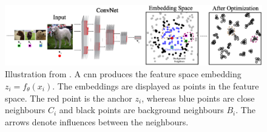 \begin{figure}[h] %
    \centering
    \includegraphics[width=360pt]{images/la_neighbourhoods.png}
    \caption{Illustration from \citet{local_aggr_2019}.
    A \ac{cnn} produces the feature space embedding $z_i = f_\theta(x_i)$.
    The embeddings are displayed as points in the feature space.
    The red point is the anchor $z_i$, 
    whereas blue points are close neighbours $C_i$ and
    black points are background neighbours $B_i$.
    The arrows denote influences between the neighbours.}
    \label{fig:la_bi_ci}
\end{figure}